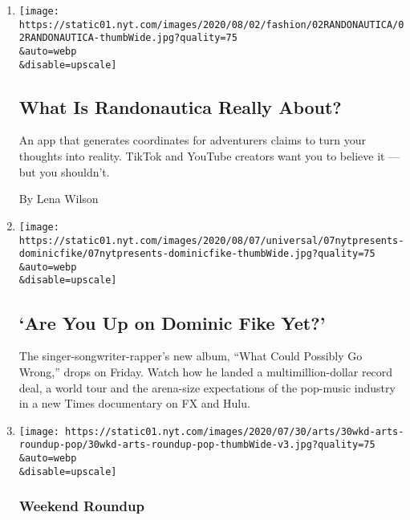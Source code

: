 \begin{enumerate}
\def\labelenumi{\arabic{enumi}.}
\item
  \href{/2020/07/31/style/randonautica-app.html}{}

  \texttt{[image: https://static01.nyt.com/images/2020/08/02/fashion/02RANDONAUTICA/02RANDONAUTICA-thumbWide.jpg?quality=75\\\&auto=webp\\\&disable=upscale]}

  \hypertarget{what-is-randonautica-really-about}{%
  \subsection{What Is Randonautica Really
  About?}\label{what-is-randonautica-really-about}}

  An app that generates coordinates for adventurers claims to turn your
  thoughts into reality. TikTok and YouTube creators want you to believe
  it --- but you shouldn't.

  By Lena Wilson
\item
  \href{/article/dominic-fike-at-first.html}{}

  \texttt{[image: https://static01.nyt.com/images/2020/08/07/universal/07nytpresents-dominicfike/07nytpresents-dominicfike-thumbWide.jpg?quality=75\\\&auto=webp\\\&disable=upscale]}

  \hypertarget{are-you-up-on-dominic-fike-yet}{%
  \subsection{`Are You Up on Dominic Fike
  Yet?'}\label{are-you-up-on-dominic-fike-yet}}

  The singer-songwriter-rapper's new album, ``What Could Possibly Go
  Wrong,'' drops on Friday. Watch how he landed a multimillion-dollar
  record deal, a world tour and the arena-size expectations of the
  pop-music industry in a new Times documentary on FX and Hulu.
\item
  \href{/2020/07/30/arts/things-to-do-weekend-coronavirus.html}{}

  \texttt{[image: https://static01.nyt.com/images/2020/07/30/arts/30wkd-arts-roundup-pop/30wkd-arts-roundup-pop-thumbWide-v3.jpg?quality=75\\\&auto=webp\\\&disable=upscale]}

  \hypertarget{weekend-roundup}{%
  \subsubsection{Weekend Roundup}\label{weekend-roundup}}


\end{enumerate}
